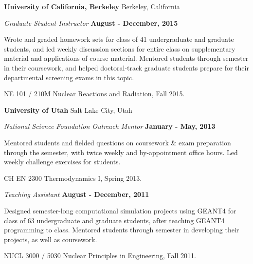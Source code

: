 
{\bf University of California, Berkeley} \hfill{ Berkeley, California}

\vspace*{-.05in}
{\em Graduate Student Instructor} \hfill {\bf August - December, 2015}

\begin{list1}
\item[] Wrote and graded homework sets  for class of 41
undergraduate and graduate students, and led weekly discussion sections for entire class on supplementary material and applications of course material.
Mentored students through semester in their coursework, and helped doctoral-track graduate students prepare for their departmental screening exams in this topic.

\vspace*{.05in}  
\begin{list2}
\item NE 101 / 210M  Nuclear Reactions and Radiation, Fall 2015.
\end{list2}
\end{list1}

{\bf University of Utah} \hfill{ Salt Lake City, Utah}

\vspace*{-.05in}
{\em National Science Foundation Outreach Mentor} \hfill {\bf January - May, 2013}

\begin{list1}
\item[] Mentored students and fielded questions on coursework \& exam preparation through the semester,
with twice weekly and by-appointment office hours. Led weekly challenge exercises for students.

\vspace*{.05in}  
\begin{list2}
\item CH EN 2300  Thermodynamics I, Spring 2013.
\end{list2}
\end{list1}





{\em Teaching Assistant} \hfill {\bf August - December, 2011}

\begin{list1}
\item[] Designed semester-long computational simulation projects using GEANT4 for class of 63
undergraduate and graduate students, after teaching GEANT4 programming to class.
Mentored students through semester in developing their projects, as well as coursework.

\vspace*{.05in}  
\begin{list2}
\item NUCL 3000 / 5030  Nuclear Principles in Engineering, Fall 2011.
\end{list2}
\end{list1}


